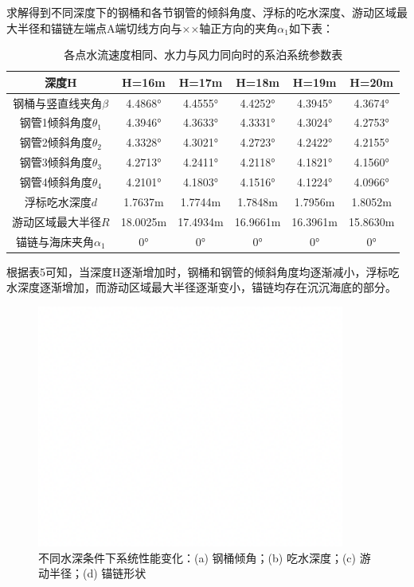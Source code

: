 \documentclass[withoutpreface,bwprint]{cumcmthesis}
\begin{document}
求解得到不同深度下的钢桶和各节钢管的倾斜角度、浮标的吃水深度、游动区域最大半径和锚链左端点A端切线方向与××轴正方向的夹角$\alpha_1$如下表：

\begin{table}[H]
\centering
\begin{tabular}{cccccc}
\toprule
深度H & H=16m & H=17m & H=18m & H=19m & H=20m \\
\midrule
钢桶与竖直线夹角$\beta$ & 4.4868° & 4.4555° & 4.4252° & 4.3945° & 4.3674° \\
钢管1倾斜角度$\theta_1$ & 4.3946° & 4.3633° & 4.3331° & 4.3024° & 4.2753° \\
钢管2倾斜角度$\theta_2$ & 4.3328° & 4.3021° & 4.2723° & 4.2422° & 4.2155° \\
钢管3倾斜角度$\theta_3$ & 4.2713° & 4.2411° & 4.2118° & 4.1821° & 4.1560° \\
钢管4倾斜角度$\theta_4$ & 4.2101° & 4.1803° & 4.1516° & 4.1224° & 4.0966° \\
浮标吃水深度$d$ & 1.7637m & 1.7744m & 1.7848m & 1.7956m & 1.8052m \\
游动区域最大半径$R$ & 18.0025m & 17.4934m & 16.9661m & 16.3961m & 15.8630m \\
锚链与海床夹角$\alpha_1$ & 0° & 0° & 0° & 0° & 0° \\
\bottomrule
\end{tabular}
\caption{各点水流速度相同、水力与风力同向时的系泊系统参数表}
\label{tab:问题三结果}
\end{table}

根据表5可知，当深度H逐渐增加时，钢桶和钢管的倾斜角度均逐渐减小，浮标吃水深度逐渐增加，而游动区域最大半径逐渐变小，锚链均存在沉沉海底的部分。

\begin{figure}[H]
\centering
\includegraphics[width=0.9\textwidth]{figures/测试图片.png}
\caption{不同水深条件下系统性能变化：(a) 钢桶倾角；(b) 吃水深度；(c) 游动半径；(d) 锚链形状}
\label{fig:water_depth_effect}
\end{figure}
\end{document}
